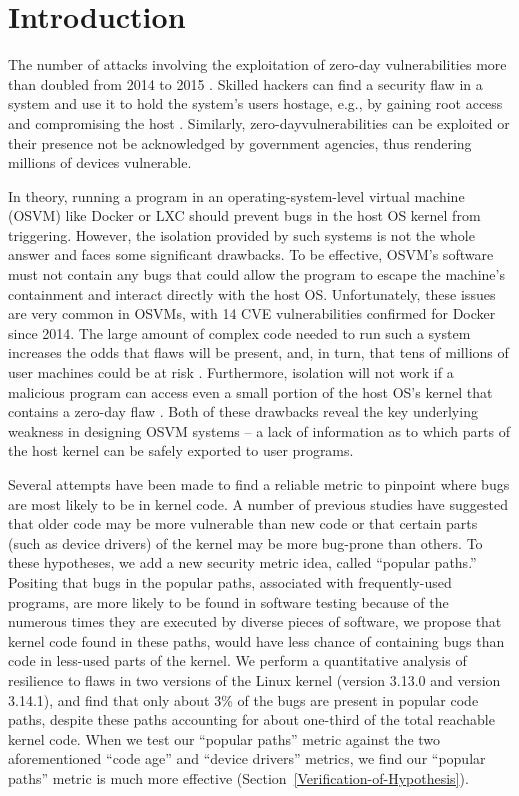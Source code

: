 \section{Introduction}
\label{sec.introduction}

The number of attacks involving the exploitation of zero-day vulnerabilities
more than doubled from 2014 to 2015 \cite{zero-day}. Skilled hackers can find a
 security flaw in a system and use it to hold the system's users hostage, e.g.,
by gaining root access and compromising the host \cite{linux-0day}. Similarly,
zero-dayvulnerabilities can be exploited \cite{fbi-0day} or their presence not
be acknowledged \cite{nsa-0day} by government agencies, thus rendering millions
of devices vulnerable.

In theory, running a program in an operating-system-level virtual machine (OSVM)
like Docker \cite{Docker} or LXC \cite{LXC} should
prevent bugs in the host OS kernel from triggering.
However, the isolation provided by such systems is not the whole answer and
faces some significant drawbacks.
To be effective, OSVM's software must not contain any bugs that could allow
the program to escape the machine's containment and interact directly with the host OS.
Unfortunately, these issues are very common in OSVMs, with 14 CVE vulnerabilities
confirmed for Docker \cite{Docker-Vulnerabilities} since 2014.
The large amount of complex code needed to run such a system increases the odds
that flaws will be present, and, in turn,
that tens of millions of user machines could be at risk \cite{linux-0day}.
Furthermore, isolation will not work if a malicious program can access even a small portion of the host OS's kernel
that contains a zero-day flaw \cite{CVE-2016-5195}.
Both of these drawbacks reveal the key underlying weakness in designing OSVM systems -- a lack of information
as to which parts of the host kernel can be safely exported to user programs.

Several attempts have been made to find a reliable metric to pinpoint where bugs
 are most likely to be in kernel code.
A number of previous studies have suggested that older code may be more vulnerable
 than new code \cite{ozment2006milk}
or that certain parts (such as device drivers) of the kernel \cite{PittSFIeld}
may be more bug-prone than others.
To these hypotheses, we add a new security metric idea, called ``popular paths.''
Positing that bugs in the popular paths, associated with frequently-used programs,
are more likely to be found in software testing
because of the numerous times they are executed by diverse pieces of software,
we propose that kernel code found in these paths,
would have less chance of containing bugs than code in less-used parts of the kernel.
We perform a quantitative analysis of resilience to flaws in two versions
of the Linux kernel (version 3.13.0 and version 3.14.1),
and find that only about 3\% of the bugs are present in popular code paths,
despite these paths accounting for about one-third of the total reachable kernel code.
When we test our ``popular paths'' metric against the two aforementioned
 ``code age'' and ``device drivers'' metrics,
we find our ``popular paths'' metric is much more effective
 (Section~{\ref{Verification-of-Hypothesis}}).

